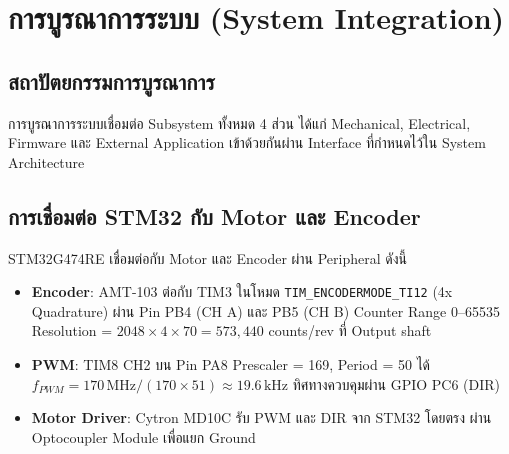 \section{การบูรณาการระบบ (System Integration)}
\label{sec:system_integration}

\subsection{สถาปัตยกรรมการบูรณาการ}
\label{subsec:integration_architecture}

การบูรณาการระบบเชื่อมต่อ Subsystem ทั้งหมด 4 ส่วน
ได้แก่ Mechanical, Electrical, Firmware และ
External Application เข้าด้วยกันผ่าน Interface
ที่กำหนดไว้ใน System Architecture


\subsection{การเชื่อมต่อ STM32 กับ Motor และ Encoder}
\label{subsec:stm32_motor_encoder_connection}

STM32G474RE เชื่อมต่อกับ Motor และ Encoder
ผ่าน Peripheral ดังนี้

\begin{itemize}
  \item \textbf{Encoder}: AMT-103 ต่อกับ TIM3
        ในโหมด \texttt{TIM\_ENCODERMODE\_TI12}
        (4x Quadrature) ผ่าน Pin PB4 (CH A)
        และ PB5 (CH B) Counter Range 0--65535
        Resolution = $2048 \times 4 \times 70
        = 573{,}440$ counts/rev ที่ Output shaft

  \item \textbf{PWM}: TIM8 CH2 บน Pin PA8
        Prescaler = 169, Period = 50
        ได้ $f_{PWM} = 170\,\text{MHz}
        / (170 \times 51) \approx 19.6\,\text{kHz}$
        ทิศทางควบคุมผ่าน GPIO PC6 (DIR)

  \item \textbf{Motor Driver}: Cytron MD10C
        รับ PWM และ DIR จาก STM32 โดยตรง
        ผ่าน Optocoupler Module เพื่อแยก Ground
\end{itemize}

